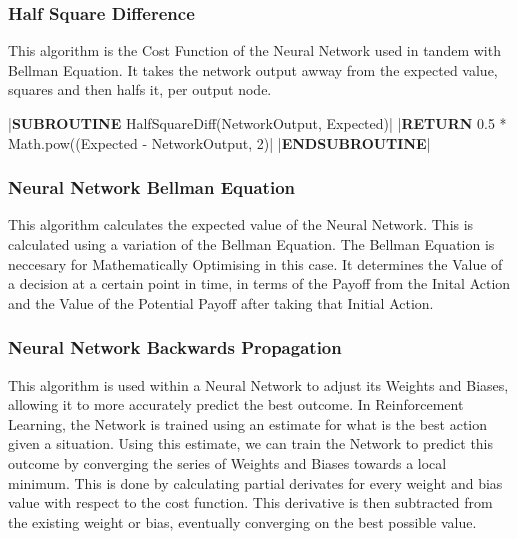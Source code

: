 \begin{flushleft}
                \vspace{0.5cm}
            \subsubsection{Half Square Difference}  
                This algorithm is the Cost Function of the Neural Network used in tandem with Bellman Equation. It takes the network output
                awway from the expected value, squares and then halfs it, per output node.

                \begin{pseudocode}
|\textbf{SUBROUTINE} HalfSquareDiff(NetworkOutput, Expected)|  
    |\textbf{RETURN} 0.5 * Math.pow((Expected - NetworkOutput, 2)|
|\textbf{ENDSUBROUTINE}|
                \end{pseudocode}

            \subsubsection{Neural Network Bellman Equation}
                This algorithm calculates the expected value of the Neural Network. This is calculated using a variation of the Bellman Equation.
                The Bellman Equation is neccesary for Mathematically Optimising in this case. It determines the Value of a decision at a certain 
                point in time, in terms of the Payoff from the Inital Action and the Value of the Potential Payoff after taking that Initial
                Action. 
                
                \vspace{0.2cm}
                \begin{pseudocode}

                \end{pseudocode}

                \vspace{0.5cm}
            \subsubsection{Neural Network Backwards Propagation}
                This algorithm is used within a Neural Network to adjust its Weights and Biases, allowing it to more accurately predict the
                best outcome. In Reinforcement Learning, the Network is trained using an estimate for what is the best action given a situation.
                Using this estimate, we can train the Network to predict this outcome by converging the series of Weights and Biases towards a
                local minimum. This is done by calculating partial derivates for every weight and bias value with respect to the cost function.
                This derivative is then subtracted from the existing weight or bias, eventually converging on the best possible value.


\end{flushleft}
